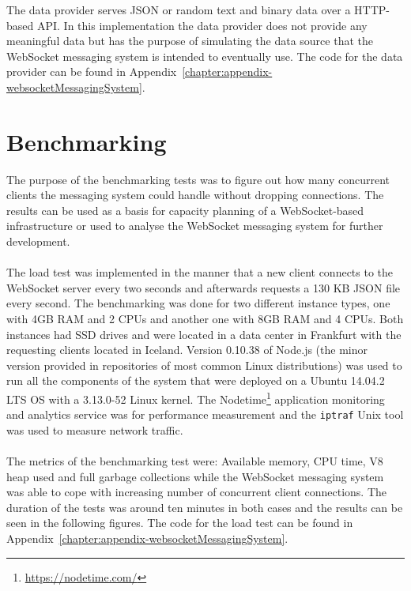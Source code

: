 The data provider serves JSON or random text and binary data over a HTTP-based API. In this implementation the data provider does not provide any meaningful data but has the purpose of simulating the data source that the WebSocket messaging system is intended to eventually use. The code for the data provider can be found in Appendix~\ref{chapter:appendix-websocketMessagingSystem}.

\section{Benchmarking}

The purpose of the benchmarking tests was to figure out how many concurrent clients the messaging system could handle without dropping connections. The results can be used as a basis for capacity planning of a WebSocket-based infrastructure or used to analyse the WebSocket messaging system for further development.
\\ \\
The load test was implemented in the manner that a new client connects to the WebSocket server every two seconds and afterwards requests a 130 KB JSON file every second. The benchmarking was done for two different instance types, one with 4GB RAM  and 2 CPUs and another one with 8GB RAM and 4 CPUs. Both instances had SSD drives and were located in a data center in Frankfurt with the requesting clients located in Iceland. Version 0.10.38 of Node.js (the minor version provided in repositories of most common Linux distributions) was used to run all the components of the system that were deployed on a Ubuntu 14.04.2 LTS OS with a 3.13.0-52 Linux kernel. The Nodetime\footnote{\url{https://nodetime.com/}} application monitoring and analytics service was for performance measurement and the \texttt{iptraf} Unix tool was used to measure network traffic.
\\ \\
The metrics of the benchmarking test were: Available memory, CPU time, V8 heap used and full garbage collections while the WebSocket messaging system was able to cope with increasing number of concurrent client connections. The duration of the tests was around ten minutes in both cases and the results can be seen in the following figures. The code for the load test can be found in Appendix~\ref{chapter:appendix-websocketMessagingSystem}.
\\
